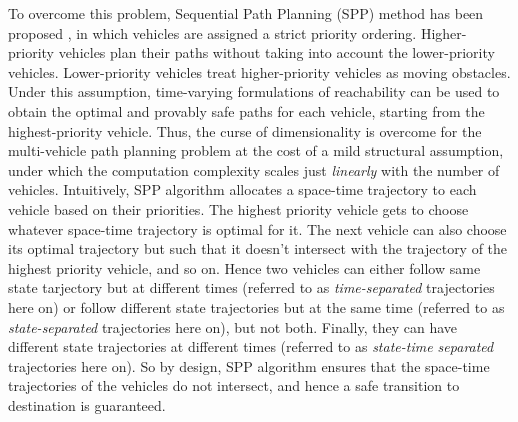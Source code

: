To overcome this problem, Sequential Path Planning (SPP) method has been proposed \cite{Chen15c}, in which vehicles are assigned a strict priority ordering. Higher-priority vehicles plan their paths without taking into account the lower-priority vehicles. Lower-priority vehicles treat higher-priority vehicles as moving obstacles. Under this assumption, time-varying formulations of reachability \cite{Bokanowski11, Fisac15} can be used to obtain the optimal and provably safe paths for each vehicle, starting from the highest-priority vehicle. Thus, the curse of dimensionality is overcome for the multi-vehicle path planning problem at the cost of a mild structural assumption, under which the computation complexity scales just \textit{linearly} with the number of vehicles. Intuitively, SPP algorithm allocates a space-time trajectory to each vehicle based on their priorities. The highest priority vehicle gets to choose whatever space-time trajectory is optimal for it. The next vehicle can also choose its optimal trajectory but such that it doesn't intersect with the trajectory of the highest priority vehicle, and so on. Hence two vehicles can either follow same state tarjectory but at different times (referred to as \textit{time-separated} trajectories here on) or follow different state trajectories but at the same time (referred to as \textit{state-separated} trajectories here on), but not both. Finally, they can have different state trajectories at different times (referred to as \textit{state-time separated} trajectories here on). So by design, SPP algorithm ensures that the space-time trajectories of the vehicles do not intersect, and hence a safe transition to destination is guaranteed.  

